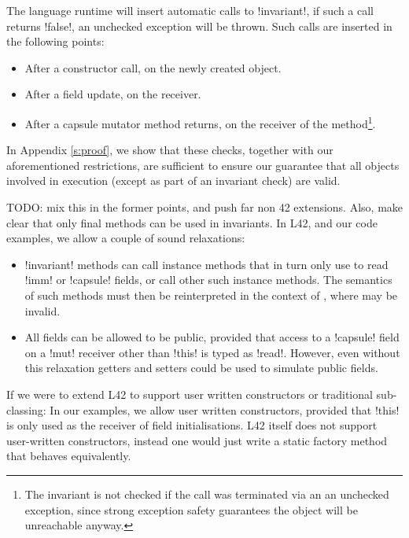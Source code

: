 The language runtime will insert automatic calls to \Q!invariant!, if such a call returns \Q!false!, an unchecked exception will be thrown. Such calls are inserted in the following points:
\SSI\begin{itemize}
	\item After a constructor call, on the newly created object.
	\item After a field update, on the receiver.
	\item After a capsule mutator method returns, on the receiver of the method\footnote{The invariant is not checked if the call was terminated via an an unchecked exception, since strong exception safety guarantees the object will be unreachable anyway.}.
\end{itemize}
\noindent In Appendix \ref{s:proof}, we show that these checks, together with our aforementioned restrictions, are sufficient to ensure our guarantee that all objects involved in execution (except as part of an invariant check) are valid.

TODO: mix this in the former points, and push far non 42 extensions.
Also, make clear that only final methods can be used in invariants.
In L42, and our code examples, we allow a couple of sound relaxations:
\SSI\begin{itemize}
	\item \Q!invariant! methods can call instance methods that in turn only use \Q@this@ to read \Q!imm! or \Q!capsule! fields, or call other such instance methods.
	The semantics of such methods must then be reinterpreted in the context of \Q@invariant@, where \Q@this@ may be invalid. 	
	\item All fields can be allowed to be public, provided that access to a \Q!capsule! field on a \Q!mut! receiver other than \Q!this! is typed as \Q!read!. However, even without this relaxation getters and setters could be used to simulate public fields.
\end{itemize}
\noindent If we were to extend L42 to support user written constructors or traditional sub-classing:
In our examples, we allow user written constructors, provided that \Q!this! is only used as the receiver of field initialisations. L42 itself does not support user-written constructors, instead one would just write a static factory method that behaves equivalently.

